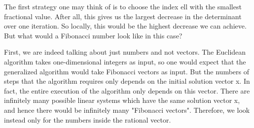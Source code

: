 The first strategy one may think of is to choose the index ell with the
smallest fractional value.
After all, this gives us the largest decrease in the determinant over one
iteration.
So locally, this would be the highest decrease we can achieve. But what would a
Fibonacci number look like in this case?

First, we are indeed talking about just numbers and not vectors.
The Euclidean algorithm takes one-dimensional integers as input, so one would
expect that the generalized algorithm would take Fibonacci vectors as input.
But the numbers of steps that the algorithm requires only depends on the
initial solution vector x.
In fact, the entire execution of the algorithm only depends on this vector.
There are infinitely many possible linear systems which have the same solution
vector x, and hence there would be infinitely many "Fibonacci vectors".
Therefore, we look instead only for the numbers inside the rational vector.


